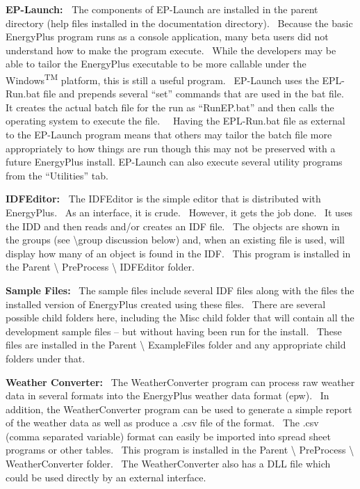 \textbf{EP-Launch:~} The components of EP-Launch are installed in the parent directory (help files installed in the documentation directory).~ Because the basic EnergyPlus program runs as a console application, many beta users did not understand how to make the program execute.~ While the developers may be able to tailor the EnergyPlus executable to be more callable under the Windows\textsuperscript{TM} platform, this is still a useful program.~ EP-Launch uses the EPL-Run.bat file and prepends several ``set'' commands that are used in the bat file.~ It creates the actual batch file for the run as ``RunEP.bat'' and then calls the operating system to execute the file.~~ Having the EPL-Run.bat file as external to the EP-Launch program means that others may tailor the batch file more appropriately to how things are run though this may not be preserved with a future EnergyPlus install. EP-Launch can also execute several utility programs from the ``Utilities'' tab.

\textbf{IDFEditor:~} The IDFEditor is the simple editor that is distributed with EnergyPlus.~ As an interface, it is crude.~ However, it gets the job done.~ It uses the IDD and then reads and/or creates an IDF file.~ The objects are shown in the groups (see \textbackslash{}group discussion below) and, when an existing file is used, will display how many of an object is found in the IDF.~ This program is installed in the Parent \textbackslash{} PreProcess \textbackslash{} IDFEditor folder.

\textbf{Sample Files:}~ The sample files include several IDF files along with the files the installed version of EnergyPlus created using these files.~ There are several possible child folders here, including the Misc child folder that will contain all the development sample files -- but without having been run for the install.~ These files are installed in the Parent \textbackslash{} ExampleFiles folder and any appropriate child folders under that.

\textbf{Weather Converter:}~ The WeatherConverter program can process raw weather data in several formats into the EnergyPlus weather data format (epw).~ In addition, the WeatherConverter program can be used to generate a simple report of the weather data as well as produce a .csv file of the format.~ The .csv (comma separated variable) format can easily be imported into spread sheet programs or other tables.~ This program is installed in the Parent \textbackslash{} PreProcess \textbackslash{} WeatherConverter folder.~ The WeatherConverter also has a DLL file which could be used directly by an external interface.

